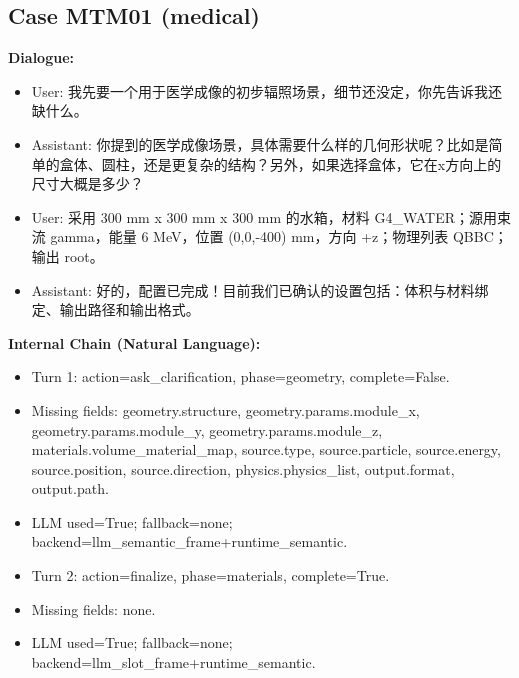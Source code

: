 \documentclass[11pt]{ctexart}
\begin{document}
\subsection{Case MTM01 (medical)}
\textbf{Dialogue:}
\begin{itemize}
\item User: 我先要一个用于医学成像的初步辐照场景，细节还没定，你先告诉我还缺什么。
\item Assistant: 你提到的医学成像场景，具体需要什么样的几何形状呢？比如是简单的盒体、圆柱，还是更复杂的结构？另外，如果选择盒体，它在x方向上的尺寸大概是多少？
\item User: 采用 300 mm x 300 mm x 300 mm 的水箱，材料 G4\_WATER；源用束流 gamma，能量 6 MeV，位置 (0,0,-400) mm，方向 +z；物理列表 QBBC；输出 root。
\item Assistant: 好的，配置已完成！目前我们已确认的设置包括：体积与材料绑定、输出路径和输出格式。
\end{itemize}
\textbf{Internal Chain (Natural Language):}
\begin{itemize}
\item Turn 1: action=ask\_clarification, phase=geometry, complete=False.
\item Missing fields: geometry.structure, geometry.params.module\_x, geometry.params.module\_y, geometry.params.module\_z, materials.volume\_material\_map, source.type, source.particle, source.energy, source.position, source.direction, physics.physics\_list, output.format, output.path.
\item LLM used=True; fallback=none; backend=llm\_semantic\_frame+runtime\_semantic.
\item Turn 2: action=finalize, phase=materials, complete=True.
\item Missing fields: none.
\item LLM used=True; fallback=none; backend=llm\_slot\_frame+runtime\_semantic.
\end{itemize}
\end{document}
